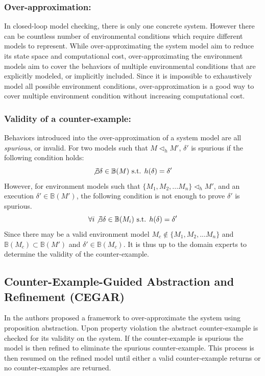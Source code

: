 \subsubsection{Over-approximation: }In closed-loop model checking, there is only one concrete system. However there can be countless number of environmental conditions which require different models to represent. While over-approximating the system model aim to reduce its state space and computational cost, over-approximating the environment models aim to cover the behaviors of multiple environmental conditions that are explicitly modeled, or implicitly included. Since it is impossible to exhaustively model all possible environment conditions, over-approximation is a good way to cover multiple environment condition without increasing computational cost. %

\subsubsection{Validity of a counter-example: }Behaviors introduced into the over-approximation of a system model are all \emph{spurious}, or invalid. For two models such that $M\triangleleft_h M'$, $\delta'$ is spurious if the following condition holds: 
$$\not\exists \delta\in\mathbb{B}(M) \text{ s.t. }h(\delta)=\delta'$$
However, for environment models such that $\{M_1,M_2,...M_n\}\triangleleft_h M'$, and an execution $\delta'\in\mathbb{B}(M')$, the following condition is not enough to prove $\delta'$ is spurious.
$$\forall i\not\exists \delta\in\mathbb{B}(M_i)\text{ s.t. }h(\delta)=\delta'$$
Since there may be a valid environment model $M_c\not\in\{M_1,M_2,...M_n\}$ and $\mathbb{B}(M_c)\subset\mathbb{B}(M')$ and $\delta'\in\mathbb{B}(M_c)$. It is thus up to the domain experts to determine the validity of the counter-example.

\subsection{Counter-Example-Guided Abstraction and Refinement (CEGAR)}
In \cite{CEGAR} the authors proposed a framework to over-approximate the system using proposition abstraction. Upon property violation the abstract counter-example is checked for its validity on the system. If the counter-example is spurious the model is then refined to eliminate the spurious counter-example. This process is then resumed on the refined model until either a valid counter-example returns or no counter-examples are returned.

